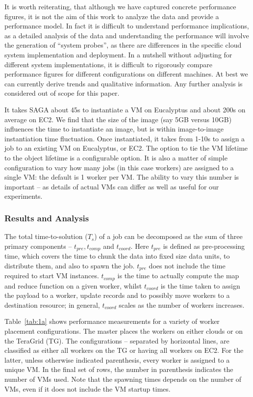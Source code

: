 \documentclass[3p,twocolumn]{elsarticle}
\begin{document}
It is worth reiterating, that although we have captured concrete
performance figures, it is not the aim of this work to analyze the
data and provide a performance model. In fact it is difficult to
understand performance implications, as a detailed analysis of the
data and understanding the performance will involve the generation of
``system probes'', as there are differences in the specific cloud
system implementation and deployment.  In a nutshell without adjusting
for different system implementations, it is difficult to rigorously
compare performance figures for different configurations on different
machines. At best we can currently derive trends and qualitative
information.  Any further analysis is considered out of scope for this
paper.

It takes SAGA about 45s to instantiate a VM on Eucalyptus and about
200s on average on EC2.  We find that the size of the image (say 5GB
versus 10GB) influences the time to instantiate an image, but is
within image-to-image instantiation time fluctuation.  Once
instantiated, it takes from 1-10s to assign a job to an existing VM on
Eucalyptus, or EC2.  The option to tie the VM lifetime to the
 object lifetime is a configurable option.  It
is also a matter of simple configuration to vary how many jobs (in
this case workers) are assigned to a single VM:  the default is 1
worker per VM.  The ability to vary this number is important -- as
details of actual VMs can differ as well as useful for our
experiments.


\subsubsection*{Results and Analysis}

The total time-to-solution ($T_s$) of a \sagamapreduce job can be
decomposed as the sum of three primary components -- $t_{pre},
t_{comp}$ and $t_{coord}$.  Here $t_{pre}$ is defined as
pre-processing time, which covers the time to chunk the data into
fixed size data units, to distribute them, and also to spawn the job.
$t_{pre}$ does not include the time required to start VM instances.
$t_{comp}$ is the time to actually compute the map and reduce function
on a given worker, whilst $t_{coord}$ is the time taken to assign the
payload to a worker, update records and to possibly move workers to a
destination resource; in general, $t_{coord}$ scales as the number of
workers increases.

Table~\ref{tab:1a} shows performance measurements for a variety of
worker placement configurations.  The master places the workers on
either clouds or on the TeraGrid (TG). The configurations -- separated
by horizontal lines, are classified as either all workers on the TG or
having all workers on EC2. For the latter, unless otherwise indicated
parenthesis, every worker is assigned to a unique VM. In the final set
of rows, the number in parenthesis indicates the number of VMs used.
Note that the spawning times depends on the number of VMs, even if it
does not include the VM startup times.
\end{document}
